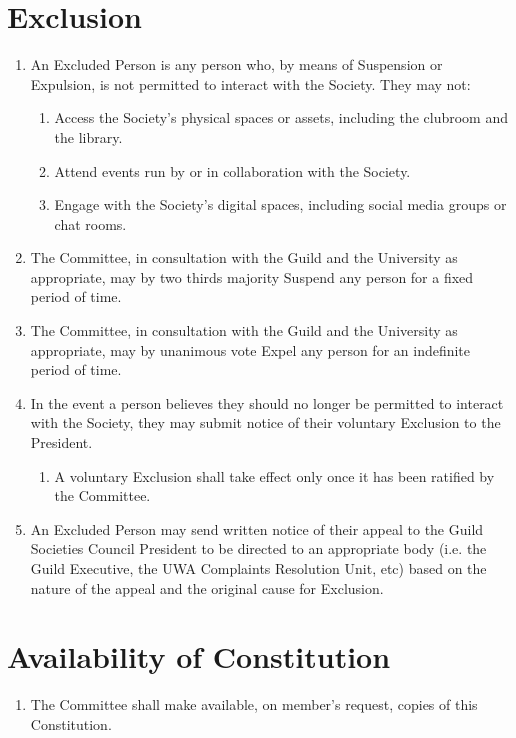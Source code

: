 \documentclass[a4paper]{article}
\begin{document}
\section{Exclusion} \label{sec:exclusion}
\begin{enumerate}
    \item An Excluded Person is any person who, by means of Suspension or Expulsion, is not permitted to interact with the Society. They may not:
          \begin{enumerate}
              \item Access the Society's physical spaces or assets, including the clubroom and the library.
              \item Attend events run by or in collaboration with the Society.
              \item Engage with the Society's digital spaces, including social media groups or chat rooms.
          \end{enumerate}
    \item The Committee, in consultation with the Guild and the University as appropriate, may by two thirds majority Suspend any person for a fixed period of time.
    \item The Committee, in consultation with the Guild and the University as appropriate, may by unanimous vote Expel any person for an indefinite period of time.
    \item In the event a person believes they should no longer be permitted to interact with the Society, they may submit notice of their voluntary Exclusion to the President.
          \begin{enumerate}
              \item A voluntary Exclusion shall take effect only once it has been ratified by the Committee.
          \end{enumerate}
    \item An Excluded Person may send written notice of their appeal to the Guild Societies Council President to be directed to an appropriate body (i.e. the Guild Executive, the UWA Complaints Resolution Unit, etc) based on the nature of the appeal and the original cause for Exclusion.
\end{enumerate}


\section{Availability of Constitution} \label{sec:availability}
\begin{enumerate}
    \item The Committee shall make available, on member's request, copies of this Constitution.
\end{enumerate}
\end{document}
